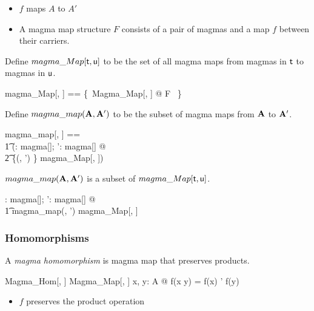 \documentclass{amsart}
\begin{document}
\begin{itemize}
	\item $f$ maps $A$ to $A'$
	\item A magma map structure $F$ consists of a pair of magmas and a map $f$ between their carriers.
\end{itemize}

Define $magma\_Map[\mathsf{t}, \mathsf{u}]$ to be the set of all magma maps
from magmas in $\mathsf{t}$ to magmas in $\mathsf{u}$.

\begin{zed}
	magma\_Map[\genT, \genU] == \{~Magma\_Map[\genT, \genU] @ F ~\}
\end{zed}

Define $magma\_map(\mathbf{A}, \mathbf{A}')$ to be the subset of magma maps 
from $\mathbf{A}$ to $\mathbf{A}'$.

\begin{zed}
	magma\_map[\genT, \genU] == \\
	\t1	(\lambda \strucA: magma[\genT]; \strucA': magma[\genU] @ \\
	\t2		\{(\strucA, \strucA') \} \dres magma\_Map[\genT, \genU])
\end{zed}

\begin{remark} $magma\_map(\mathbf{A}, \mathbf{A}')$ is a subset of $magma\_Map[\mathsf{t}, \mathsf{u}]$.

\begin{zed}
	\forall \strucA: magma[\setT]; \strucA': magma[\setU] @ \\
	\t1	magma\_map(\strucA, \strucA') \subseteq magma\_Map[\setT, \setU]
\end{zed}

\end{remark}

\subsubsection{Homomorphisms}

A \textit{magma homomorphism} is magma map that preserves products.

\begin{schema}{Magma\_Hom}[\genT, \genU]
	Magma\_Map[\genT, \genU]
\where
	\forall x, y: A @ f(x \opG y) = f(x) \opG' f(y)
\end{schema}

\begin{itemize}
	\item $f$ preserves the product operation
\end{itemize}
\end{document}
